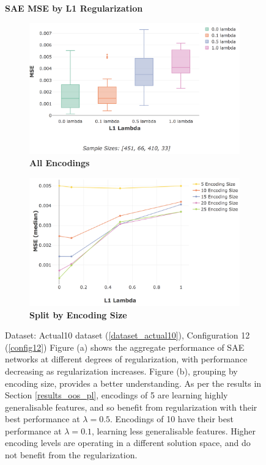 \documentclass[a4paper,11pt,oneside]{article}
\theoremstyle{plain}
\theoremstyle{definition}
\begin{document}
	\begin{figure}[H]
	\centering
	\textbf{SAE MSE by L1 Regularization}
	\begin{subfigure}{.99\textwidth}
		\centering 
		\includegraphics[scale=0.4]{images/results/8_6_complexity/actual_mse_reg.png}
		\caption{\textbf{All Encodings} 
			\newline }
		\label{figure-actual_mse_reg}
	\end{subfigure}
	\begin{subfigure}{.99\textwidth}
		\centering 
		\includegraphics[scale=0.4]{images/results/8_6_complexity/actual_sae_mse_by_encoding.png}
		\caption{\textbf{Split by Encoding Size} 
			\newline }
		\label{figure-actual_sae_mse_by_encoding}
	\end{subfigure}
	\caption[SAE MSE by L1 Regularization]
	{Dataset: Actual10 dataset (\ref{dataset_actual10}), Configuration 12 (\ref{config12})
		\newline Figure (a) shows the aggregate performance of SAE networks at different degrees of regularization, with performance decreasing as regularization increases. Figure (b), grouping by encoding size, provides a better understanding. As per the results in Section \ref{results_oos_pl}, encodings of 5 are learning highly generalisable features, and so benefit from regularization with their best performance at $\lambda = 0.5$. Encodings of 10 have their best performance at $\lambda = 0.1$, learning less generalisable features. Higher encoding levels are operating in a different solution space, and do not benefit from the regularization.
	}
	\label{figure-mse_reg}
	\end{figure}
\end{document}
